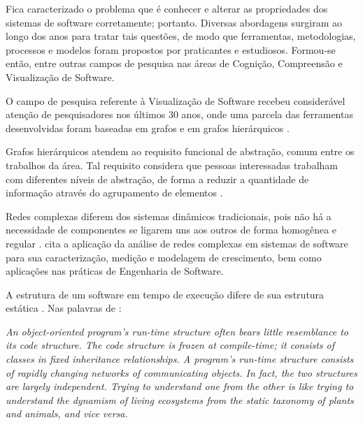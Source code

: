 Fica caracterizado o problema que é conhecer e alterar as propriedades dos
sistemas de software corretamente; portanto.
Diversas abordagens surgiram ao longo dos anos para tratar tais questões, de
modo que ferramentas, metodologias, processos e modelos foram propostos por
praticantes e estudiosos. Formou-se então, entre outras campos de pesquisa nas
áreas de Cognição, Compreensão e Visualização de Software.

O campo de pesquisa referente à Visualização de Software recebeu considerável
atenção de pesquisadores nos últimos 30 anos, onde uma parcela das ferramentas
desenvolvidas foram baseadas em grafos \cite{Storey2006:Theories} e em grafos
hierárquicos \cite{Jahnke2002:Visualizations}.

Grafos hierárquicos atendem ao requisito funcional de abstração, comum entre os
trabalhos da área. Tal requisito considera que pessoas interessadas trabalham
com diferentes níveis de abstração, de forma a reduzir a quantidade de
informação através do agrupamento de elementos \cite{Kienle2007:Requirements}.

Redes complexas diferem dos sistemas dinâmicos tradicionais, pois não há a
necessidade de componentes se ligarem uns aos outros de forma homogênea e
regular \cite{Sayama:2015:Complex}.
 cita a aplicação da análise de redes complexas
em sistemas de software para sua caracterização, medição e modelagem de
crescimento, bem como aplicações nas práticas de Engenharia de Software.


A estrutura de um software em tempo de execução difere de sua estrutura
estática \cite{Crockford2008:JavaScriptGoodParts}.
Nas palavras de :

\begin{citacao}
\textit{An object-oriented program's run-time structure often bears little
resemblance to its code structure. The code structure is frozen at compile-time;
it consists of classes in fixed inheritance relationships. A program's run-time
structure consists of rapidly changing networks of communicating objects. In
fact, the two structures are largely independent. Trying to understand one from
the other is like trying to understand the dynamism of living ecosystems from
the static taxonomy of plants and animals, and vice versa.}
\end{citacao}

